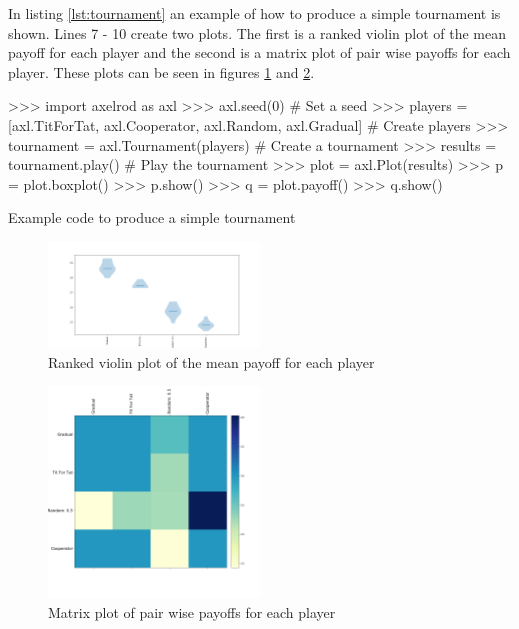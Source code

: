 In listing \ref{lst:tournament} an example of how to produce a simple tournament is shown.
Lines 7 - 10 create two plots.
The first is a ranked violin plot of the mean payoff for each player and the second is a matrix plot of pair wise payoffs for each player.
These plots can be seen in figures \ref{fig:violinplot} and \ref{fig:matrixplot}.

\begin{listing}[htbp!]
    \begin{ExampleCode}
>>> import axelrod as axl
>>> axl.seed(0)  # Set a seed
>>> players = [axl.TitForTat, axl.Cooperator, axl.Random, axl.Gradual]  # Create players
>>> tournament = axl.Tournament(players)  # Create a tournament
>>> results = tournament.play()  # Play the tournament
>>> plot = axl.Plot(results)
>>> p = plot.boxplot()
>>> p.show()
>>> q = plot.payoff()
>>> q.show()
    \end{ExampleCode}
    \caption{Example code to produce a simple tournament}
    \label{lst:tournament}
\end{listing}

\begin{figure}[hbtp!]
    \centering
    \includegraphics[width=0.5\textwidth]{../img/examples/small_violin.png}
    \caption{Ranked violin plot of the mean payoff for each player}
    \label{fig:violinplot}
\end{figure}

\begin{figure}
    \centering
    \includegraphics[width=0.5\textwidth]{../img/examples/small_payoff.png}
    \caption{Matrix plot of pair wise payoffs for each player}
    \label{fig:matrixplot}
\end{figure}


